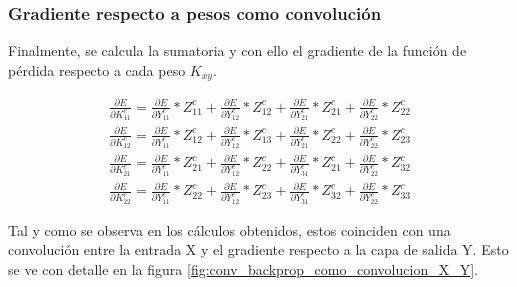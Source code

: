 \subsubsection{Gradiente respecto a pesos como convolución}

Finalmente, se calcula la sumatoria y con ello el gradiente de la función de pérdida respecto a cada peso $K_{xy}$.

\begin{gather}
	\frac{\partial E}{\partial K^c_{11}} = \frac{\partial E}{\partial Y^c_{11}} * Z^c_{11} + \frac{\partial E}{\partial Y^c_{12}} * Z^c_{12} + \frac{\partial E}{\partial Y^c_{21}} * Z^c_{21} + \frac{\partial E}{\partial Y^c_{22}} * Z^c_{22} \\
	\frac{\partial E}{\partial K^c_{12}} = \frac{\partial E}{\partial Y^c_{11}} * Z^c_{12} + \frac{\partial E}{\partial Y^c_{12}} * Z^c_{13} + \frac{\partial E}{\partial Y^c_{21}} * Z^c_{22} + \frac{\partial E}{\partial Y^c_{22}} * Z^c_{23} \\	
	\frac{\partial E}{\partial K^c_{21}} = \frac{\partial E}{\partial Y^c_{11}} * Z^c_{21} + \frac{\partial E}{\partial Y^c_{12}} * Z^c_{22} + \frac{\partial E}{\partial Y^c_{31}} * Z^c_{21} + \frac{\partial E}{\partial Y^c_{22}} * Z^c_{32} \\
	\frac{\partial E}{\partial K^c_{22}} = \frac{\partial E}{\partial Y^c_{11}} * Z^c_{22} + \frac{\partial E}{\partial Y^c_{12}} * Z^c_{23} + \frac{\partial E}{\partial Y^c_{31}} * Z^c_{32} + \frac{\partial E}{\partial Y^c_{22}} * Z^c_{33}
\end{gather}

Tal y como se observa en los cálculos obtenidos, estos coinciden con una convolución entre la entrada X y el gradiente respecto a la capa de salida Y. Esto se ve con detalle en la figura \ref{fig:conv_backprop_como_convolucion_X_Y}. \cite{conv_backprop}

